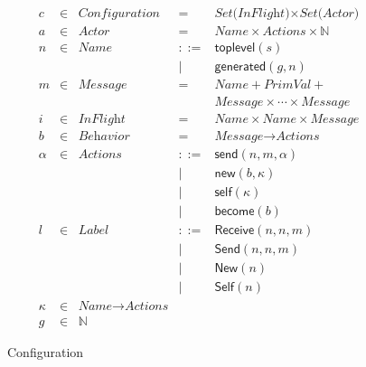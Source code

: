 \begin{figure}[t]
  \begin{displaymath}
    \begin{array}{rclcl}
      c & \in & \textit{Configuration} & =   & \textit{Set(InFlight)} \times \textit{Set(Actor)} \\
      a & \in & \textit{Actor}  & =   & \textit{Name} \times \textit{Actions} \times \mathbb{N} \\
      n & \in & \textit{Name}   & ::= & \textsf{toplevel}(s) \\
        &     &                 &   | & \textsf{generated}(g, n) \\
      m & \in & \textit{Message} & =  & \textit{Name} + \textit{PrimVal} + \\
        &     &                 &     & \textit{Message} \times \cdots \times \textit{Message} \\
      i & \in & \textit{InFlight} & = & \textit{Name} \times \textit{Name} \times \textit{Message} \\
      b & \in & \textit{Behavior} & = & \textit{Message} \rightarrow \textit{Actions} \\
      \alpha & \in & \textit{Actions} & ::= & \textsf{send}(n, m, \alpha) \\
        &     &                 &   | & \textsf{new}(b, \kappa) \\
        &     &                 &   | & \textsf{self}(\kappa) \\
        &     &                 &   | & \textsf{become}(b) \\
      l & \in & \textit{Label}  & ::= & \textsf{Receive}(n, n, m) \\
        &     &                 &   | & \textsf{Send}(n, n, m) \\
        &     &                 &   | & \textsf{New}(n) \\
        &     &                 &   | & \textsf{Self}(n) \\
      \kappa & \in & \textit{Name} \rightarrow \textit{Actions} \\
      g & \in & \mathbb{N} & &
    \end{array}
  \end{displaymath}
  \caption{Configuration}\label{expr:formalization:config}
\end{figure}


